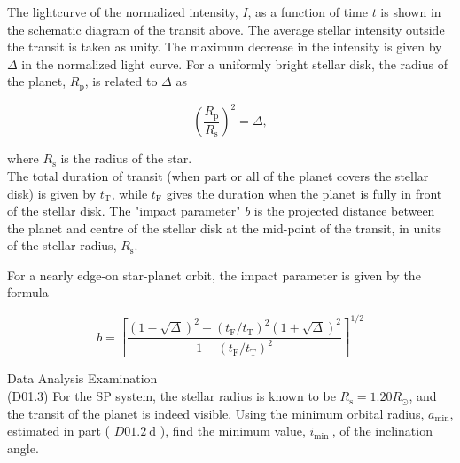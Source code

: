 \documentclass[10pt]{article}
\begin{document}
    The lightcurve of the normalized intensity, $I$, as a function of time $t$ is shown in the schematic diagram of the transit above. The average stellar intensity outside the transit is taken as unity. The maximum decrease in the intensity is given by $\Delta$ in the normalized light curve. For a uniformly bright stellar disk, the radius of the planet, $R_{\mathrm{p}}$, is related to $\Delta$ as
    
    $$
    \left(\frac{R_{\mathrm{p}}}{R_{\mathrm{s}}}\right)^{2}=\Delta,
    $$
    
    where $R_{\mathrm{s}}$ is the radius of the star.\\
    The total duration of transit (when part or all of the planet covers the stellar disk) is given by $t_{\mathrm{T}}$, while $t_{\mathrm{F}}$ gives the duration when the planet is fully in front of the stellar disk. The "impact parameter" $b$ is the projected distance between the planet and centre of the stellar disk at the mid-point of the transit, in units of the stellar radius, $R_{\mathrm{s}}$.
    
    For a nearly edge-on star-planet orbit, the impact parameter is given by the formula
    
    $$
    b=\left[\frac{(1-\sqrt{\Delta})^{2}-\left(t_{\mathrm{F}} / t_{\mathrm{T}}\right)^{2}(1+\sqrt{\Delta})^{2}}{1-\left(t_{\mathrm{F}} / t_{\mathrm{T}}\right)^{2}}\right]^{1 / 2}
    $$
    
    Data Analysis Examination\\
    (D01.3) For the SP system, the stellar radius is known to be $R_{\mathrm{s}}=1.20 R_{\odot}$, and the transit of the planet is indeed visible. Using the minimum orbital radius, $a_{\min }$, estimated in part ( $D 01.2 \mathrm{~d}$ ), find the minimum value, $i_{\text {min }}$, of the inclination angle.
    
\end{document}

